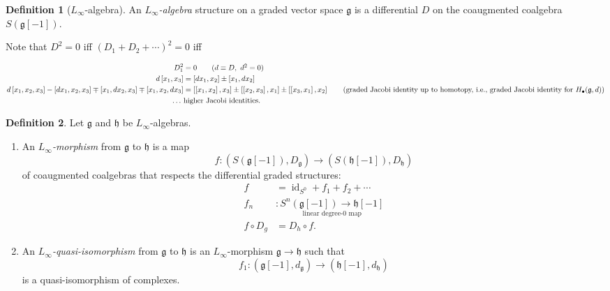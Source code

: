 \documentclass[10pt,letterpaper,cm]{nupset}
\theoremstyle{definition}
\newtheorem{defn}{Definition}[subsection]
\theoremstyle{theorem}
\theoremstyle{remark}
\newcommand{\1}{\mathbb{1}}
\newcommand{\0}{\vec 0}
\DeclareMathOperator{\id}{id}
\newcommand{\be}{\begin{enumerate}}
\newcommand{\ee}{\end{enumerate}}
\begin{document}
\begin{defn}[$L_{\infty}$-algebra]
An \textit{$L_{\infty}$-algebra} structure on a graded vector space $\mathfrak{g}$ is a differential $D$ on the coaugmented coalgebra $S(\mathfrak{g}\left[{-1}\right])$.
\end{defn}


Note that $D^2 = 0$ iff $\left(D_1 + D_2 + \cdots \right)^2 =0$ iff

\begin{align*}
D_1^2   & = 0 \tag{$d \equiv D, \ d^2 = 0$}
\\ d\left[x_1, x_3\right] & = \left[d{x_1}, x_2\right] \pm \left[x_1, d{x_2}\right]
\\ d\left[x_1, x_2, x_3\right] - \left[d{x_1}, x_2, x_3\right] \mp  \left[x_1, d{x_2}, x_3\right] \mp \left[x_1, x_2, d{x_3}\right] & = \left[\left[x_1, x_2\right], x_3\right] \pm  
\left[\left[x_2, x_3\right], x_1\right] \pm \left[\left[x_3, x_1\right], x_2\right] \tag{graded Jacobi identity up to homotopy, i.e., graded Jacobi identity for $H_{\bullet}(\mathfrak{g},d)$}
\\  \ldots \ &  \text{higher Jacobi identities}.
\end{align*}


\begin{defn} Let $\mathfrak{g}$ and $\mathfrak{h}$ be $L_{\infty}$-algebras.
\be
\item An \textit{$L_{\infty}$-morphism} from $\mathfrak{g}$ to $\mathfrak{h}$ is a map
\[
f : \left(S(\mathfrak{g}\left[{-1}\right]), D_{\mathfrak{g}}\right) \to \left(S(\mathfrak{h}\left[{-1}\right]), D_{\mathfrak{h}}\right)
\] of coaugmented coalgebras  that respects the differential graded structures:
\begin{align*}
f & = \id_{S^0} + f_1 + f_2 + \cdots \tag{``Taylor expansion'' of $f$}
\\ f_n & : \underset{\text{linear degree-$0$ map}}{S^n(\mathfrak{g}\left[{-1}\right]) \to \mathfrak{h}\left[{-1}\right]}
\\ f \circ D_g & = D_h \circ f .
\end{align*}
\item An \textit{$L_{\infty}$-quasi-isomorphism} from $\mathfrak{g}$ to $\mathfrak{h}$ is an $L_{\infty}$-morphism $\mathfrak{g} \to \mathfrak{h}$ such that 
\[
f_1 : \left(\mathfrak{g}\left[{-1}\right], d_{\mathfrak{g}}\right) \to \left(\mathfrak{h}\left[{-1}\right], d_{\mathfrak{h}}\right) 
\] is a quasi-isomorphism of complexes. 
\ee
\end{defn}
\end{document}

